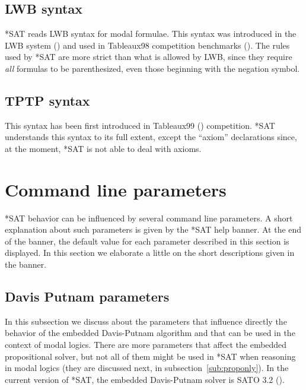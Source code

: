 \documentclass[12pt]{report}
\begin{document}
\subsection{LWB syntax}

*SAT reads LWB syntax for modal formulae. This syntax was introduced
in the LWB system (\cite{heu96a}) and used in Tableaux98 competition benchmarks (\cite{tab98}).
The rules used by *SAT are more strict than what is allowed
by LWB, since they require \textit{all} formulas to be
parenthesized, even those beginning with the negation symbol.

\subsection{TPTP syntax}

This syntax has been first introduced in Tableaux99 (\cite{mas99a}) competition. *SAT
understands this syntax to its full extent, except the ``axiom''
declarations since, at the moment, *SAT is not able to deal with
axioms.

\section{Command line parameters}
\label{sec:params}

*SAT behavior can be influenced by several command line parameters. A
short explanation about such parameters is given by the *SAT
help banner. At the end of the banner, the default value for each 
parameter described in this section is displayed.
In this section we elaborate a little on the short descriptions
given in the banner.

\subsection{Davis Putnam parameters} 

In this subsection we discuss about the parameters that influence directly
the behavior of the embedded Davis-Putnam algorithm and that can be
used in the context of modal logics. There are more parameters that
affect the embedded propositional solver, but not all of them might be
used in *SAT when reasoning in modal logics (they are discussed next,
in subsection~\ref{sub:proponly}). In the current version of *SAT, the
embedded Davis-Putnam solver is SATO 3.2 (\cite{zha97a}).
\end{document}
